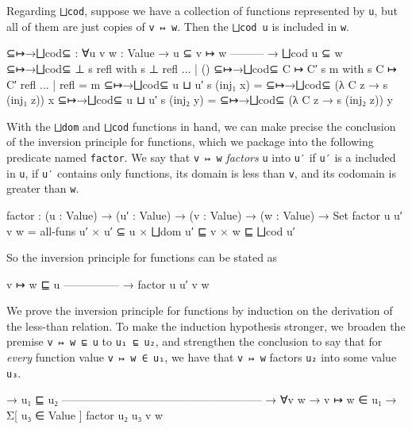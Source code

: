 Regarding \texttt{⨆cod}, suppose we have a collection of functions
represented by \texttt{u}, but all of them are just copies of
\texttt{v\ ↦\ w}. Then the \texttt{⨆cod\ u} is included in \texttt{w}.

\begin{fence}
\begin{code}
⊆↦→⨆cod⊆ : ∀{u v w : Value}
        → u ⊆ v ↦ w
          ---------
        → ⨆cod u ⊆ w
⊆↦→⨆cod⊆ {⊥} s refl with s {⊥} refl
... | ()
⊆↦→⨆cod⊆ {C ↦ C′} s m with s {C ↦ C′} refl
... | refl = m
⊆↦→⨆cod⊆ {u ⊔ u′} s (inj₁ x) = ⊆↦→⨆cod⊆ (λ {C} z → s (inj₁ z)) x
⊆↦→⨆cod⊆ {u ⊔ u′} s (inj₂ y) = ⊆↦→⨆cod⊆ (λ {C} z → s (inj₂ z)) y
\end{code}
\end{fence}

With the \texttt{⨆dom} and \texttt{⨆cod} functions in hand, we can make
precise the conclusion of the inversion principle for functions, which
we package into the following predicate named \texttt{factor}. We say
that \texttt{v\ ↦\ w} \emph{factors} \texttt{u} into \texttt{u′} if
\texttt{u′} is a included in \texttt{u}, if \texttt{u′} contains only
functions, its domain is less than \texttt{v}, and its codomain is
greater than \texttt{w}.

\begin{fence}
\begin{code}
factor : (u : Value) → (u′ : Value) → (v : Value) → (w : Value) → Set
factor u u′ v w = all-funs u′  ×  u′ ⊆ u  ×  ⨆dom u′ ⊑ v  ×  w ⊑ ⨆cod u′
\end{code}
\end{fence}

So the inversion principle for functions can be stated as

\begin{myDisplay}
  v ↦ w ⊑ u
  ---------------
→ factor u u′ v w
\end{myDisplay}

We prove the inversion principle for functions by induction on the
derivation of the less-than relation. To make the induction hypothesis
stronger, we broaden the premise \texttt{v\ ↦\ w\ ⊑\ u} to
\texttt{u₁\ ⊑\ u₂}, and strengthen the conclusion to say that for
\emph{every} function value \texttt{v\ ↦\ w\ ∈\ u₁}, we have that
\texttt{v\ ↦\ w} factors \texttt{u₂} into some value \texttt{u₃}.

\begin{myDisplay}
→ u₁ ⊑ u₂
  ------------------------------------------------------
→ ∀{v w} → v ↦ w ∈ u₁ → Σ[ u₃ ∈ Value ] factor u₂ u₃ v w
\end{myDisplay}

